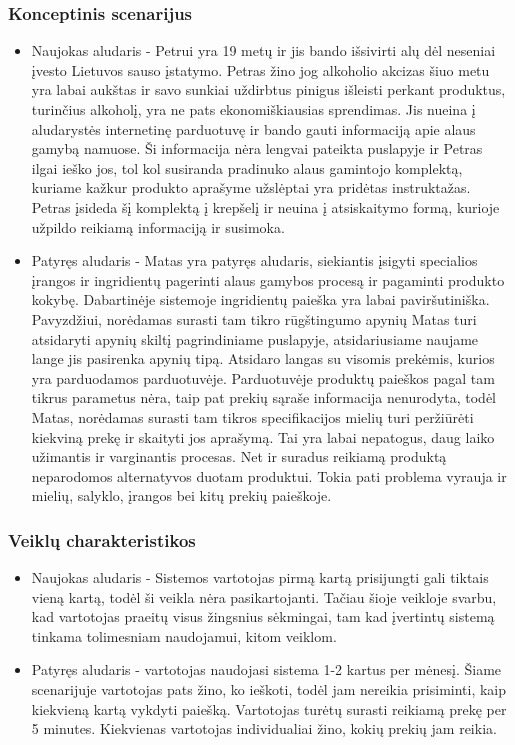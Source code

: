 \documentclass[oneside]{VUMIFPSkursinis}
\begin{document}
		\subsubsection{Konceptinis scenarijus}
			\begin{itemize}
				\item{Naujokas aludaris - Petrui yra 19 metų ir jis bando išsivirti alų dėl neseniai įvesto Lietuvos sauso įstatymo.
					Petras žino jog alkoholio akcizas šiuo metu yra labai aukštas ir savo sunkiai uždirbtus pinigus išleisti perkant produktus, turinčius alkoholį, yra ne pats ekonomiškiausias sprendimas.
					Jis nueina į aludarystės internetinę parduotuvę ir bando gauti informaciją apie alaus gamybą namuose.
					Ši informacija nėra lengvai pateikta puslapyje ir Petras ilgai ieško jos, tol kol susiranda pradinuko alaus gamintojo komplektą, kuriame kažkur produkto aprašyme užslėptai yra pridėtas instruktažas.
					Petras įsideda šį komplektą į krepšelį ir neuina į atsiskaitymo formą, kurioje užpildo reikiamą informaciją ir susimoka.}
				\item{Patyręs aludaris - Matas yra patyręs aludaris, siekiantis įsigyti specialios įrangos ir ingridientų pagerinti alaus gamybos procesą ir pagaminti produkto kokybę.
					Dabartinėje sistemoje ingridientų paieška yra labai paviršutiniška.
					Pavyzdžiui, norėdamas surasti tam tikro rūgštingumo apynių Matas turi atsidaryti apynių skiltį pagrindiniame puslapyje, atsidariusiame naujame lange jis pasirenka apynių tipą.
					Atsidaro langas su visomis prekėmis, kurios yra parduodamos parduotuvėje.
					Parduotuvėje produktų paieškos pagal tam tikrus parametus nėra, taip pat prekių sąraše informacija nenurodyta, todėl Matas, norėdamas surasti tam tikros specifikacijos mielių turi peržiūrėti kiekviną prekę ir skaityti jos aprašymą.
					Tai yra labai nepatogus, daug laiko užimantis ir varginantis procesas.
					Net ir suradus reikiamą produktą neparodomos alternatyvos duotam produktui.
					Tokia pati problema vyrauja ir mielių, salyklo, įrangos bei kitų prekių paieškoje. }
			\end{itemize}
		\subsubsection{Veiklų charakteristikos}
				\begin{itemize}
					\item{Naujokas aludaris - Sistemos vartotojas pirmą kartą prisijungti gali tiktais vieną kartą, todėl ši veikla nėra pasikartojanti.
						Tačiau šioje veikloje svarbu, kad vartotojas praeitų visus žingsnius sėkmingai, tam kad įvertintų sistemą tinkama tolimesniam naudojamui, kitom veiklom. }
					\item{Patyręs aludaris - vartotojas naudojasi sistema 1-2 kartus per mėnesį.
						Šiame scenarijuje vartotojas pats žino, ko ieškoti, todėl jam nereikia prisiminti, kaip kiekvieną kartą vykdyti paiešką.
						Vartotojas turėtų surasti reikiamą prekę per 5 minutes.
						Kiekvienas vartotojas individualiai žino, kokių prekių jam reikia.}
					
				\end{itemize}
\end{document}
